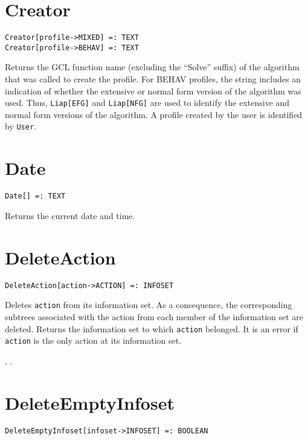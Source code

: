 \section*{Creator}\label{PrimCreator}
\begin{verbatim}
Creator[profile->MIXED] =: TEXT
Creator[profile->BEHAV] =: TEXT
\end{verbatim}

\noindent
Returns the GCL function name (excluding the ``Solve'' suffix) of
the algorithm that was called to create the profile. For
BEHAV profiles, the string includes an indication of whether the
extensive or normal form version of the algorithm was used.  Thus,
\verb+Liap[EFG]+ and \verb+Liap[NFG]+ are used to identify the
extensive and normal form versions of the algorithm.  A profile
created by the user is identified by \verb+User+.  


\section*{Date}\label{PrimDate}
\begin{verbatim}
Date[] =: TEXT 
\end{verbatim}

\noindent Returns the current date and time. 


\section*{DeleteAction}\label{PrimDeleteAction}
\begin{verbatim}
DeleteAction[action->ACTION] =: INFOSET 
\end{verbatim}

\noindent
Deletes \verb+action+ from its information set. 
As a consequence, the corresponding subtrees associated
with the action from each member of the information set are deleted.
Returns the information set to which \verb+action+ belonged.  It is an
error if \verb+action+ is the only action at its information set.

\seealso {},
.


\section*{DeleteEmptyInfoset}\label{PrimDeleteEmptyInfoset}
\begin{verbatim}
DeleteEmptyInfoset[infoset->INFOSET] =: BOOLEAN 
\end{verbatim}

